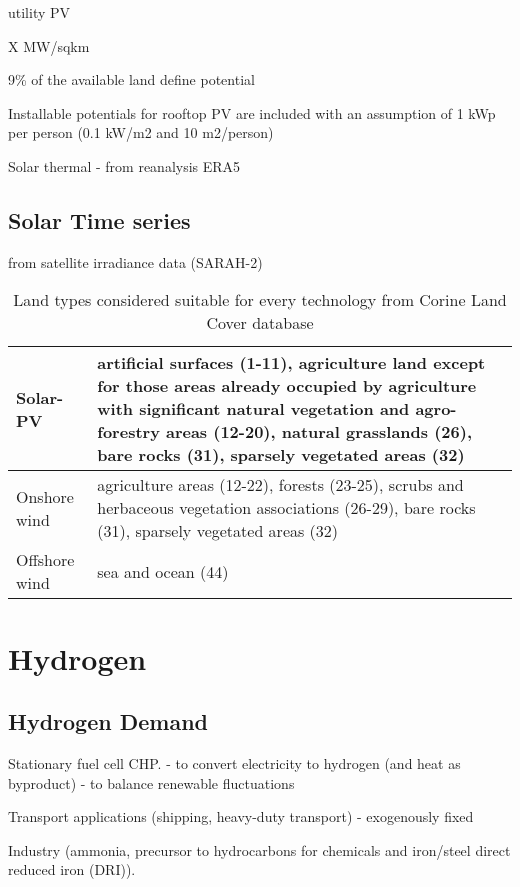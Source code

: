 utility PV

X MW/sqkm

9\% of the available land define potential

Installable potentials for rooftop PV are included with an assumption of 1 kWp
per person (0.1 kW/m2 and 10 m2/person)

Solar thermal
- from reanalysis ERA5

\subsection{Solar Time series}

from satellite irradiance data (SARAH-2)


\begin{table}
    \caption{Land types considered suitable for every technology from Corine Land Cover database}
    \small
    \begin{tabularx}{\textwidth}{lX}
        \toprule
        Solar-PV & artificial surfaces (1-11), agriculture land except for those
        areas already occupied by agriculture with significant natural
        vegetation and agro-forestry areas (12-20), natural grasslands (26), bare rocks (31),
        sparsely vegetated areas (32) \\ \midrule
        Onshore wind & agriculture areas (12-22), forests (23-25), scrubs and herbaceous vegetation associations (26-29), bare rocks (31), sparsely vegetated areas (32) \\ \midrule
        Offshore wind & sea and ocean (44) \\ \bottomrule
    \end{tabularx}
\end{table}

\section{Hydrogen}

\subsection{Hydrogen Demand}

Stationary fuel cell CHP.
- to convert electricity to hydrogen (and heat as byproduct)
- to balance renewable fluctuations

Transport applications (shipping, heavy-duty transport)
- exogenously fixed

Industry (ammonia, precursor to hydrocarbons for chemicals and iron/steel direct reduced iron (DRI)).

